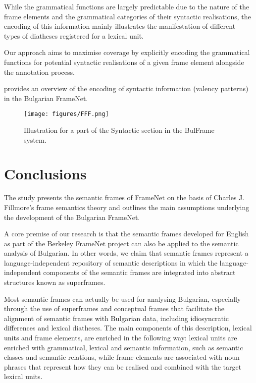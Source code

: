 \documentclass[output=paper,colorlinks,citecolor=brown]{langscibook}
\begin{document}
While the grammatical functions are largely predictable due to the nature of the frame elements and the grammatical categories of their syntactic realisations, the encoding of this information mainly illustrates the manifestation of different types of diatheses registered for a lexical unit.

Our approach aims to maximise coverage by explicitly encoding the grammatical functions for potential syntactic realisations of a given frame element alongside the annotation process.

 provides an overview of the encoding of syntactic information (valency patterns) in the Bulgarian FrameNet.

\begin{figure}[ht]
  \texttt{[image: figures/FFF.png]}
  \caption{Illustration for a part of the Syntactic section in the BulFrame system.}
  \label{fig:FFF}
\end{figure}

\section{Conclusions}

The study presents the semantic frames of FrameNet on the basis of Charles J. Fillmore's frame semantics theory and outlines the main assumptions underlying the development of the Bulgarian FrameNet.

A core premise of our research is that the semantic frames developed for English as part of the Berkeley FrameNet project can also be applied to the semantic analysis of Bulgarian. In other words, we claim that semantic frames represent a language-independent repository of semantic descriptions in which the language-independent components of the semantic frames are integrated into abstract structures known as superframes.

Most semantic frames can actually be used for analysing Bulgarian, especially through the use of superframes and conceptual frames that facilitate the alignment of semantic frames with Bulgarian data, including idiosyncratic differences and lexical diatheses. The main components of this description, lexical units and frame elements, are enriched in the following way: lexical units are enriched with grammatical, lexical and semantic information, such as semantic classes and semantic relations, while frame elements are associated with noun phrases that represent how they can be realised and combined with the target lexical units.
\end{document}
